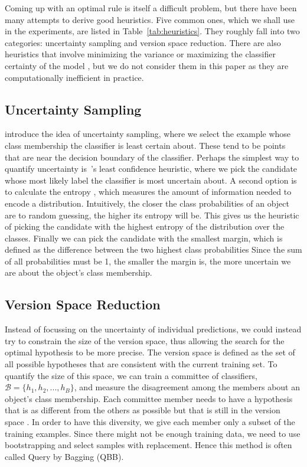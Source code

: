 \documentclass[fleqn,10pt,lineno]{wlpeerj} %
\newcommand{\B}{\mathcal{B}}
\begin{document}
Coming up with an optimal rule is itself a difficult problem, but there have
been many attempts to derive good heuristics. Five common ones, which we shall
use in the experiments, are listed in Table~\ref{tab:heuristics}. They roughly
fall into two categories: uncertainty sampling and version space reduction.
There are also heuristics that involve minimizing the variance or maximizing
the classifier certainty of the model \citep{schein07}, but we do not consider
them in this paper as they are computationally inefficient in practice.

\subsection{Uncertainty Sampling}

\cite{lewis94} introduce the idea of uncertainty sampling, where we select the
example whose class membership the classifier is least certain about. These
tend to be points that are near the decision boundary of the classifier.
Perhaps the simplest way to quantify uncertainty is~\cite{culotta05}'s least
confidence heuristic, where we pick the candidate whose most likely label the
classifier is most uncertain about. A second option is to calculate the entropy
\citep{shannon48}, which measures the amount of information needed to encode a
distribution. Intuitively, the closer the class probabilities of an object are
to random guessing, the higher its entropy will be. This gives us the heuristic
of picking the candidate with the highest entropy of the distribution over the
classes. Finally we can pick the candidate with the smallest margin, which is
defined as the difference between the two highest class probabilities
\citep{scheffer01} Since the sum of all probabilities must be 1, the smaller
the margin is, the more uncertain we are about the object's class membership.

\subsection{Version Space Reduction}

Instead of focussing on the uncertainty of individual predictions, we could
instead try to constrain the size of the version space, thus allowing the
search for the optimal hypothesis to be more precise. The version space is
defined as the set of all possible hypotheses that are consistent with the
current training set. To quantify the size of this space, we can train a
committee of classifiers, $\B = \{h_1, h_2, ..., h_B\}$, and measure the
disagreement among the members about an object's class membership. Each
committee member needs to have a hypothesis that is as different from the
others as possible but that is still in the version space \citep{melville04}.
In order to have this diversity, we give each member only a subset of the
training examples. Since there might not be enough training data, we need to
use bootstrapping and select samples with replacement. Hence this method is
often called Query by Bagging (QBB).
\end{document}
